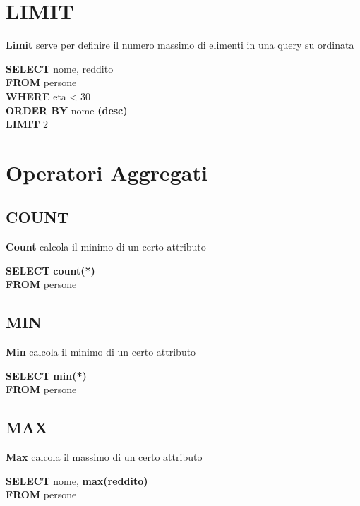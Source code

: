 \documentclass[12pt, a4paper]{article}
\begin{document}
\begin{frame}
		\section{LIMIT}
			\textbf{Limit} serve per definire il numero massimo di elimenti in una query su ordinata
				\begin{center}
				\justifying
				\textbf{SELECT} nome,  reddito\\
	 			\textbf{FROM} persone \\
				\textbf{WHERE} eta < 30 \\
				\textbf{ORDER BY} nome \textbf{(desc)} \\
				\textbf{LIMIT} 2
				\end{center} 

		\section{Operatori Aggregati}
			\subsection{COUNT}
				\textbf{Count} calcola il minimo di un certo attributo
					\begin{center}
					\justifying
					\textbf{SELECT} \textbf{count(*)} \\
		 			\textbf{FROM} persone \\
					\end{center} 
			
			\subsection{MIN}
				\textbf{Min}
					 calcola il minimo di un certo attributo
					\begin{center}
					\justifying
					\textbf{SELECT} \textbf{min(*)} \\	
		 			\textbf{FROM} persone \\
					\end{center} 
	
			\subsection{MAX}
				\textbf{Max} 
					calcola il massimo di un certo attributo
					\begin{center}
					\justifying
					\textbf{SELECT} nome,  \textbf{max(reddito)} \\
		 			\textbf{FROM} persone \\
					\end{center} 
	

\end{frame}
\end{document}
